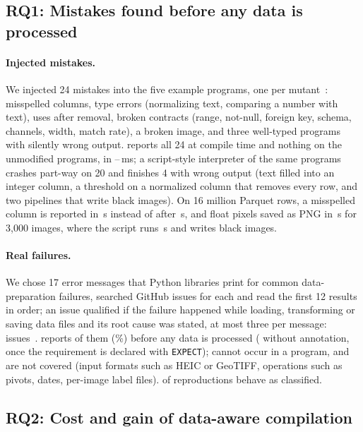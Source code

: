 \subsection{RQ1: Mistakes found before any data is processed}

\paragraph{Injected mistakes.} We injected 24 mistakes into the five example programs, one per
mutant~\cite{jia2011}: misspelled columns, type errors (normalizing text, comparing a number with
text), uses after removal, broken contracts (range, not-null, foreign key, schema, channels, width,
match rate), a broken image, and three well-typed programs with silently wrong output. \PL reports all
24 at compile time and nothing on the unmodified programs, in \RqOneMsMin--\RqOneMsMax\,ms; a
script-style interpreter of the same programs crashes part-way on 20 and finishes 4 with wrong output
(text filled into an integer column, a threshold on a normalized column that removes every row, and
two pipelines that write black images). On 16 million Parquet rows, a misspelled column is reported in
\ScTabNamePl\,s instead of after \ScTabNameScript\,s, and float pixels saved as PNG in \ScImgFloatPl\,s
for 3,000 images, where the script runs \ScImgFloatScript\,s and writes black images.

\paragraph{Real failures.} We chose 17 error messages that Python libraries print for common
data-preparation failures, searched GitHub issues for each and read the first 12 results in order; an
issue qualified if the failure happened while loading, transforming or saving data files and its root
cause was stated, at most three per message: \RbTotal{} issues~\cite{islam2019,humbatova2020}. \PL
reports \RbEarly{} of them (\RbEarlyPct\%) before any data is processed (\RbCompile{} without
annotation, \RbContract{} once the requirement is declared with \texttt{EXPECT}); \RbDesign{} cannot
occur in a \PL program, and \RbNone{} are not covered (input formats such as HEIC or GeoTIFF,
operations such as pivots, dates, per-image label files). \RbPass{} of \RbCases{} reproductions behave
as classified.

\subsection{RQ2: Cost and gain of data-aware compilation}

